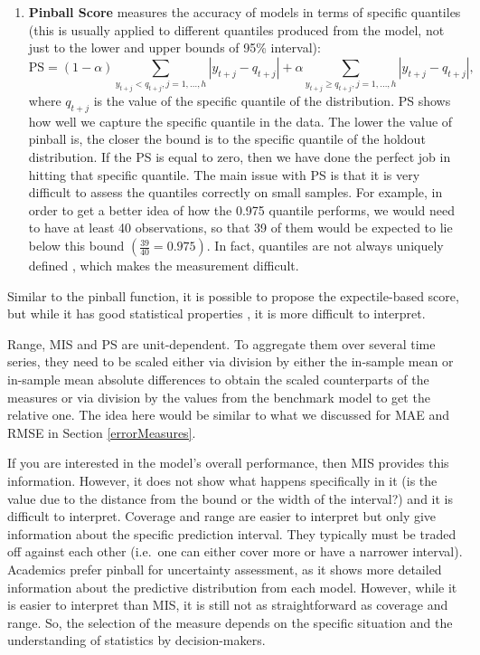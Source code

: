 \documentclass[]{book}
\theoremstyle{definition}
\theoremstyle{definition}
\theoremstyle{definition}
\theoremstyle{definition}
\theoremstyle{remark}
\begin{document}
\begin{enumerate}
\item
  \textbf{Pinball Score} \citep{Koenker1978} measures the accuracy of models in terms of specific quantiles (this is usually applied to different quantiles produced from the model, not just to the lower and upper bounds of 95\% interval):
  \begin{equation}
   \mathrm{PS} = (1 -\alpha) \sum_{y_{t+j} < q_{t+j}, j=1,\dots,h } |y_{t+j} -q_{t+j}| + \alpha \sum_{y_{t+j} \geq q_{t+j} , j=1,\dots,h } |y_{t+j} -q_{t+j}|,
   \label{eq:pinball}
  \end{equation}
  where \(q_{t+j}\) is the value of the specific quantile of the distribution. PS shows how well we capture the specific quantile in the data. The lower the value of pinball is, the closer the bound is to the specific quantile of the holdout distribution. If the PS is equal to zero, then we have done the perfect job in hitting that specific quantile. The main issue with PS is that it is very difficult to assess the quantiles correctly on small samples. For example, in order to get a better idea of how the 0.975 quantile performs, we would need to have at least 40 observations, so that 39 of them would be expected to lie below this bound \(\left(\frac{39}{40} = 0.975\right)\). In fact, quantiles are not always uniquely defined \citep[see, for example,][]{Taylor2020}, which makes the measurement difficult.
\end{enumerate}

Similar to the pinball function, it is possible to propose the expectile-based score, but while it has good statistical properties \citep{Taylor2020}, it is more difficult to interpret.

Range, MIS and PS are unit-dependent. To aggregate them over several time series, they need to be scaled either via division by either the in-sample mean or in-sample mean absolute differences to obtain the scaled counterparts of the measures or via division by the values from the benchmark model to get the relative one. The idea here would be similar to what we discussed for MAE and RMSE in Section \ref{errorMeasures}.

If you are interested in the model's overall performance, then MIS provides this information. However, it does not show what happens specifically in it (is the value due to the distance from the bound or the width of the interval?) and it is difficult to interpret. Coverage and range are easier to interpret but only give information about the specific prediction interval. They typically must be traded off against each other (i.e.~one can either cover more or have a narrower interval). Academics prefer pinball for uncertainty assessment, as it shows more detailed information about the predictive distribution from each model. However, while it is easier to interpret than MIS, it is still not as straightforward as coverage and range. So, the selection of the measure depends on the specific situation and the understanding of statistics by decision-makers.
\end{document}

